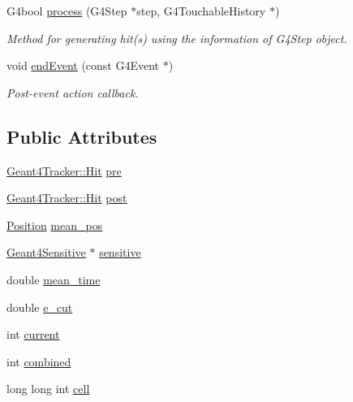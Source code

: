 \begin{DoxyCompactItemize}
G4bool \hyperlink{struct_d_d4hep_1_1_simulation_1_1_tracker_combine_a8d3a583a2f70cb49bcc3d6eda5363a85}{process} (G4\+Step $\ast$step, G4\+Touchable\+History $\ast$)
\begin{DoxyCompactList}\small\item\em Method for generating hit(s) using the information of G4\+Step object. \end{DoxyCompactList}\item 
void \hyperlink{struct_d_d4hep_1_1_simulation_1_1_tracker_combine_a03b50811a7b164514baebc2f252fba62}{end\+Event} (const G4\+Event $\ast$)
\begin{DoxyCompactList}\small\item\em Post-\/event action callback. \end{DoxyCompactList}\end{DoxyCompactItemize}
\subsection*{Public Attributes}
\begin{DoxyCompactItemize}
\item 
\hyperlink{class_d_d4hep_1_1_simulation_1_1_geant4_tracker_1_1_hit}{Geant4\+Tracker\+::\+Hit} \hyperlink{struct_d_d4hep_1_1_simulation_1_1_tracker_combine_a05e41bf826c42ad8e4ddefb914a9e079}{pre}
\item 
\hyperlink{class_d_d4hep_1_1_simulation_1_1_geant4_tracker_1_1_hit}{Geant4\+Tracker\+::\+Hit} \hyperlink{struct_d_d4hep_1_1_simulation_1_1_tracker_combine_a04a629d7ed0ac04fd945466a40bb7e48}{post}
\item 
\hyperlink{namespace_d_d4hep_1_1_geometry_a55083902099d03506c6db01b80404900}{Position} \hyperlink{struct_d_d4hep_1_1_simulation_1_1_tracker_combine_a66a9636b7e0e4712718366da7db0ddf6}{mean\+\_\+pos}
\item 
\hyperlink{class_d_d4hep_1_1_simulation_1_1_geant4_sensitive}{Geant4\+Sensitive} $\ast$ \hyperlink{struct_d_d4hep_1_1_simulation_1_1_tracker_combine_afa91afc4a7df2a80a889ab1a1ba4d4b6}{sensitive}
\item 
double \hyperlink{struct_d_d4hep_1_1_simulation_1_1_tracker_combine_a88f539f333235ec8d8746fe11fd70e12}{mean\+\_\+time}
\item 
double \hyperlink{struct_d_d4hep_1_1_simulation_1_1_tracker_combine_acd9b60d0c1b8cee45c1745a4ae167d24}{e\+\_\+cut}
\item 
int \hyperlink{struct_d_d4hep_1_1_simulation_1_1_tracker_combine_aa8bb9faf2d8ce6bac98f969e5bb9943c}{current}
\item 
int \hyperlink{struct_d_d4hep_1_1_simulation_1_1_tracker_combine_a09c500ccd4bca917b081930ae9e2c5ce}{combined}
\item 
long long int \hyperlink{struct_d_d4hep_1_1_simulation_1_1_tracker_combine_a93f684a7d6865b0f92a82560b3558d0d}{cell}
\end{DoxyCompactItemize}


